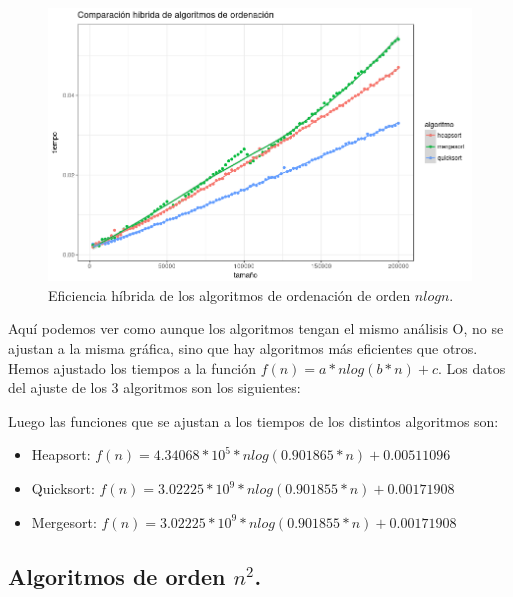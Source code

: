 \documentclass[a4paper, 11pt]{article}
\begin{document}
\begin{figure}[!hbp]
	\includegraphics[width=\textwidth]{hibridaor.png}
	\caption{Eficiencia híbrida de los algoritmos de ordenación de orden $nlogn$.\label{hibridaor1}}
\end{figure}

    Aquí podemos ver como aunque los algoritmos tengan el mismo análisis O, no se ajustan a la misma gráfica, sino que hay algoritmos más eficientes que otros. 
    Hemos ajustado los tiempos a la función $f(n) = a*nlog(b*n)+c$. Los datos del ajuste de los 3 algoritmos son los siguientes:

	
	Luego las funciones que se ajustan a los tiempos de los distintos algoritmos son:
	\begin{itemize}
		\item Heapsort: $f(n) = 4.34068*10^5*nlog(0.901865*n)+0.00511096$
		\item Quicksort: $f(n) = 3.02225*10^9*nlog(0.901855*n)+0.00171908$
		\item Mergesort: $f(n) = 3.02225*10^{9}*nlog(0.901855*n)+0.00171908$
	\end{itemize}

\pagebreak
\subsection{Algoritmos de orden $n^2$.}
\end{document}
